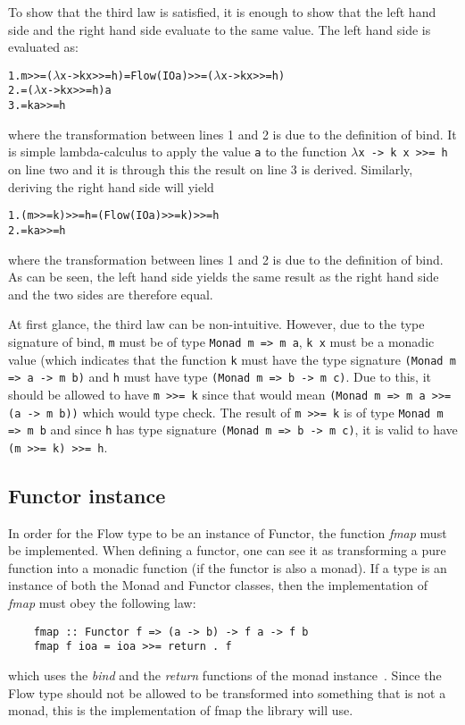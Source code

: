 To show that the third law is satisfied, it is enough to show that the left hand side and the right hand side evaluate to the same value. The left hand side is evaluated as:
\begin{alltt}
  1. m >>= (\(\lambda\)x -> k x >>= h) = Flow (IO a) >>= (\(\lambda\)x -> k x >>= h)
  2.                         = (\(\lambda\)x -> k x >>= h) a
  3.                         = k a >>= h
\end{alltt}
where the transformation between lines 1 and 2 is due to the definition of bind. It is simple lambda-calculus to apply the value {\tt a} to the function {\tt \(\lambda\)x -> k x >>= h} on line two and it is through this the result on line 3 is derived.
\newline
\newline
Similarly, deriving the right hand side will yield
\begin{alltt}
  1. (m >>= k) >>= h = (Flow (IO a) >>= k) >>= h
  2.                 = k a >>= h
\end{alltt}
where the transformation between lines 1 and 2 is due to the definition of bind. As can be seen, the left hand side yields the same result as the right hand side and the two sides are therefore equal.

At first glance, the third law can be non-intuitive. However, due to the type signature of bind, {\tt m} must be of type {\tt Monad m => m a}, {\tt k x} must be a monadic value (which indicates that the function {\tt k} must have the type signature {\tt (Monad m => a -> m b)} and {\tt h} must have type {\tt (Monad m => b -> m c)}. Due to this, it should be allowed to have {\tt m >>= k} since that would mean {\tt (Monad m => m a >>= (a -> m b))} which would type check. The result of {\tt m >>= k} is of type {\tt Monad m => m b} and since {\tt h} has type signature {\tt (Monad m => b -> m c)}, it is valid to have {\tt (m >>= k) >>= h}.
\subsection{Functor instance}
In order for the Flow type to be an instance of Functor, the function \emph{fmap} must be implemented. When defining a functor, one can see it as transforming a pure function into a monadic function (if the functor is also a monad). If a type is an instance of both the Monad and Functor classes, then the implementation of \emph{fmap} must obey the following law:
\begin{verbatim}
    fmap :: Functor f => (a -> b) -> f a -> f b
    fmap f ioa = ioa >>= return . f
\end{verbatim}
which uses the \emph{bind} and the \emph{return} functions of the monad instance~\cite{functor-monad-law}. Since the Flow type should not be allowed to be transformed into something that is not a monad, this is the implementation of fmap the library will use.
